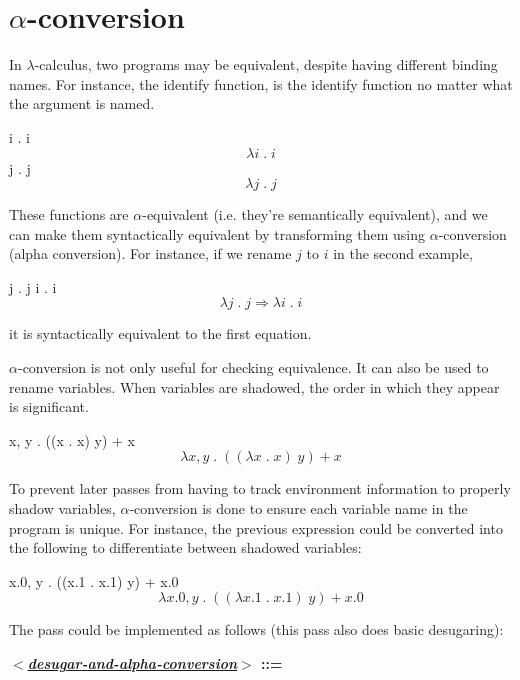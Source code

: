 \documentclass{book}
\newcommand{\plainlink}[1]{#1}
\let\SOriginalthesubsubsection\thesubsubsection
\newcommand{\Ssubsection}[2]{\subsection[#1]{#2}\let\thesubsubsection\SOriginalthesubsubsection}
\def\texMathInline#1{\ensuremath{#1}}
\def\texMathDisplay#1{\ifmmode #1\else\[#1\]\fi}%
\renewcommand{\Ssubsection}[2]{\section[#1]{#2}}
\begin{document}
\Ssubsection{$\alpha${-}conversion}{$\alpha${-}conversion}\label{t:x28part_x22x5fx2dconversionx22x29}

In $\lambda${-}calculus, two programs may be equivalent, despite having different
binding names. For instance, the identify function, is the identify
function no matter what the argument is named.

\texMathDisplay{\lambda i \; . \; i}
\texMathDisplay{\lambda j \; . \; j}

These functions are $\alpha${-}equivalent (i.e. they{'}re semantically equivalent),
and we can make them syntactically equivalent by transforming them using
$\alpha${-}conversion (alpha conversion). For instance, if we rename \texMathInline{j} to
\texMathInline{i} in the second example,

\texMathDisplay{\lambda j \; . \; j \Rightarrow \lambda i \; . \; i}

it is syntactically equivalent to the first equation.

$\alpha${-}conversion is not only useful for checking equivalence. It can also be
used to rename variables. When variables are shadowed, the order in which
they appear is significant.

\texMathDisplay{\lambda x, y \; . \; ((\lambda x \; . \; x) \; y) + x}

To prevent later passes from having to track environment information to
properly shadow variables, $\alpha${-}conversion is done to ensure each variable
name in the program is unique. For instance, the previous expression could
be converted into the following to differentiate between shadowed
variables:

\texMathDisplay{\lambda x.0, y \; . \; ((\lambda x.1 \; . \; x.1) \; y) + x.0}

The pass could be implemented as follows (this pass also does basic
desugaring):

\label{t:x28elem_x28chunk_x22x3cdesugarx2dandx2dalphax2dconversionx3ex3a1x22x29x29}\textbf{\textit{\hyperref[t:x28elem_x28chunk_x22x3cdesugarx2dandx2dalphax2dconversionx3ex3a1x22x29x29]{\plainlink{$<$desugar{-}and{-}alpha{-}conversion$>$}}} ::=}
\end{document}
